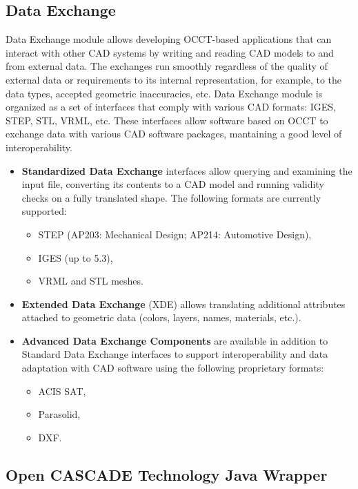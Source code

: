 \subsection{Data Exchange}
\label{sec2.2.2}

Data Exchange module allows developing \gls{OCCT}-based applications that can interact with other \gls{CAD} systems by writing and reading \gls{CAD} models to and from external data. The exchanges run smoothly regardless of the quality of external data or requirements to its internal representation, for example, to the data types, accepted geometric inaccuracies, etc. Data Exchange module is organized as a set of interfaces that comply with various \gls{CAD} formats: IGES, STEP, STL, VRML, etc. These interfaces allow software based on \gls{OCCT} to exchange data with various \gls{CAD} software packages, mantaining a good level of interoperability.
%
\begin{itemize}
\renewcommand\labelitemi{\tiny$\blacksquare$}
\renewcommand\labelitemii{\tiny$\bullet$}
\item \textbf{Standardized Data Exchange} interfaces allow querying and examining the input file, converting its contents to a \gls{CAD} model and running validity checks on a fully translated shape. The following formats are currently supported:
	\begin{itemize}
	\item STEP (AP203: Mechanical Design; AP214: Automotive Design),
	\item IGES (up to 5.3),
	\item VRML and STL meshes.
	\end{itemize}
\item \textbf{Extended Data Exchange} (XDE) allows translating additional attributes attached to geometric data (colors, layers, names, materials, etc.).
\item \textbf{Advanced Data Exchange Components} are available in addition to Standard Data Exchange interfaces to support interoperability and data adaptation with \gls{CAD} software using the following proprietary formats:
	\begin{itemize}
	\item ACIS SAT,
	\item Parasolid,
	\item DXF.
	\end{itemize}
\end{itemize}
%

\subsection{Open CASCADE Technology Java Wrapper}
\label{sec2.2.3}

